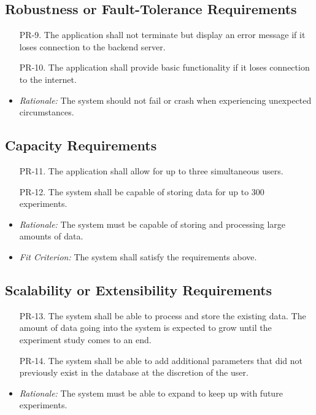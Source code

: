 \documentclass[12pt]{article}
\begin{document}
\subsection{Robustness or Fault-Tolerance Requirements}
\begin{enumerate}
  \item[PR-9.] The application shall not terminate but display an error message if it loses connection to the backend server.
  \item[PR-10.] The application shall provide basic functionality if it loses connection to the internet.
\end{enumerate}
\begin{itemize}
  \item \textit{Rationale:} The system should not fail or crash when experiencing unexpected circumstances.
\end{itemize}

\subsection{Capacity Requirements}
\begin{enumerate}
  \item[PR-11.] The application shall allow for up to three simultaneous users.
  \item[PR-12.] The system shall be capable of storing data for up to 300 experiments.
\end{enumerate}
\begin{itemize}
  \item \textit{Rationale:} The system must be capable of storing and processing large amounts of data.
  \item \textit{Fit Criterion:} The system shall satisfy the requirements above.
\end{itemize}

\subsection{Scalability or Extensibility Requirements}
\begin{enumerate}
  \item[PR-13.] The system shall be able to process and store the existing data. The amount of data going into the system is expected to grow until the experiment study comes to an end.
  \item[PR-14.] The system shall be able to add additional parameters that did not previously exist in the database at the discretion of the user.
\end{enumerate}
\begin{itemize}
  \item \textit{Rationale:} The system must be able to expand to keep up with future experiments.
\end{itemize}
\end{document}
